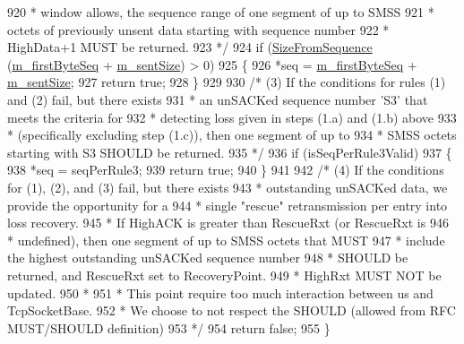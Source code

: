 \begin{DoxyCode}
920 \textcolor{comment}{   *     window allows, the sequence range of one segment of up to SMSS}
921 \textcolor{comment}{   *     octets of previously unsent data starting with sequence number}
922 \textcolor{comment}{   *     HighData+1 MUST be returned.}
923 \textcolor{comment}{   */}
924   \textcolor{keywordflow}{if} (\hyperlink{classns3_1_1TcpTxBuffer_a6e44c34fdb2c14dcc11dbbe86d8b328a}{SizeFromSequence} (\hyperlink{classns3_1_1TcpTxBuffer_a46b67e5cb3396b43a41dd3fd5b135346}{m\_firstByteSeq} + 
      \hyperlink{classns3_1_1TcpTxBuffer_ae45302ec0a3b3d757b0f3ad85e88e363}{m\_sentSize}) > 0)
925     \{
926       *seq = \hyperlink{classns3_1_1TcpTxBuffer_a46b67e5cb3396b43a41dd3fd5b135346}{m\_firstByteSeq} + \hyperlink{classns3_1_1TcpTxBuffer_ae45302ec0a3b3d757b0f3ad85e88e363}{m\_sentSize};
927       \textcolor{keywordflow}{return} \textcolor{keyword}{true};
928     \}
929 
930   \textcolor{comment}{/* (3) If the conditions for rules (1) and (2) fail, but there exists}
931 \textcolor{comment}{   *     an unSACKed sequence number 'S3' that meets the criteria for}
932 \textcolor{comment}{   *     detecting loss given in steps (1.a) and (1.b) above}
933 \textcolor{comment}{   *     (specifically excluding step (1.c)), then one segment of up to}
934 \textcolor{comment}{   *     SMSS octets starting with S3 SHOULD be returned.}
935 \textcolor{comment}{   */}
936   \textcolor{keywordflow}{if} (isSeqPerRule3Valid)
937     \{
938       *seq = seqPerRule3;
939       \textcolor{keywordflow}{return} \textcolor{keyword}{true};
940     \}
941 
942   \textcolor{comment}{/* (4) If the conditions for (1), (2), and (3) fail, but there exists}
943 \textcolor{comment}{   *     outstanding unSACKed data, we provide the opportunity for a}
944 \textcolor{comment}{   *     single "rescue" retransmission per entry into loss recovery.}
945 \textcolor{comment}{   *     If HighACK is greater than RescueRxt (or RescueRxt is}
946 \textcolor{comment}{   *     undefined), then one segment of up to SMSS octets that MUST}
947 \textcolor{comment}{   *     include the highest outstanding unSACKed sequence number}
948 \textcolor{comment}{   *     SHOULD be returned, and RescueRxt set to RecoveryPoint.}
949 \textcolor{comment}{   *     HighRxt MUST NOT be updated.}
950 \textcolor{comment}{   *}
951 \textcolor{comment}{   * This point require too much interaction between us and TcpSocketBase.}
952 \textcolor{comment}{   * We choose to not respect the SHOULD (allowed from RFC MUST/SHOULD definition)}
953 \textcolor{comment}{   */}
954   \textcolor{keywordflow}{return} \textcolor{keyword}{false};
955 \}
\end{DoxyCode}



